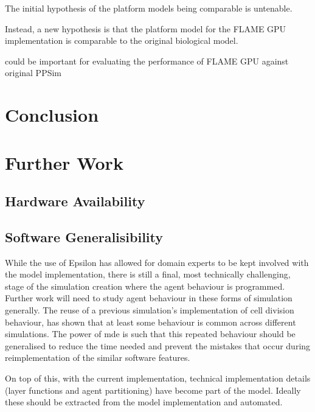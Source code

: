 \documentclass{UoYCSproject}
\begin{document}
The initial hypothesis of the platform models being comparable is untenable.

Instead, a new hypothesis is that the platform model for the \gls{FLAME GPU} implementation is comparable to the original biological model.

\cite{statistical_tests} could be important for evaluating the performance of \gls{FLAME GPU} against original PPSim

\section{Conclusion}

\section{Further Work}
\subsection{Hardware Availability}

\subsection{Software Generalisibility}%
While the use of Epsilon has allowed for domain experts to be kept involved with the model implementation, there is still a final, most technically challenging, stage of the simulation creation where the agent behaviour is programmed.
Further work will need to study agent behaviour in these forms of simulation generally.
The reuse of a previous simulation's implementation of cell division behaviour, has shown that at least some behaviour is common across different simulations.
The power of \gls{mde} is such that this repeated behaviour should be generalised to reduce the time needed and prevent the mistakes that occur during reimplementation of the similar software features.

On top of this, with the current implementation, technical implementation details (layer functions and agent partitioning) have become part of the model.
Ideally these should be extracted from the model implementation and automated.
\end{document}
